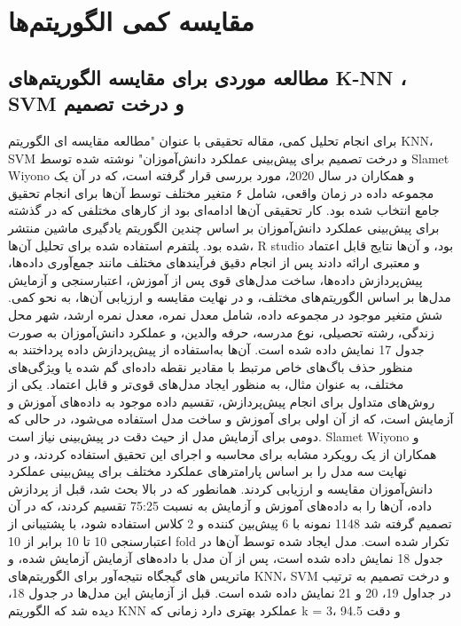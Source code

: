 \documentclass{CSICC2020}
\begin{document}
\section{مقایسه کمی الگوریتم‌ها}


\subsection{مطالعه موردی برای مقایسه الگوریتم‌های K-NN ، SVM و درخت تصمیم }
برای انجام تحلیل کمی، مقاله تحقیقی با عنوان "مطالعه مقایسه ای الگوریتم KNN، SVM و درخت تصمیم برای پیش‌بینی عملکرد دانش‌آموزان" نوشته شده توسط Slamet Wiyono و همکاران در سال 2020، مورد بررسی قرار گرفته است، که در آن یک مجموعه داده در زمان واقعی، شامل ۶ متغیر مختلف توسط آن‌ها برای انجام تحقیق جامع انتخاب شده بود. کار تحقیقی آن‌ها ادامه‌ای بود از کارهای مختلفی که در گذشته برای پیش‌بینی عملکرد دانش‌آموزان بر اساس چندین الگوریتم یادگیری ماشین منتشر شده بود. پلتفرم استفاده شده برای تحلیل آن‌ها، R studio بود، و آن‌ها نتایج قابل اعتماد و معتبری ارائه دادند پس از انجام دقیق فرآیندهای مختلف مانند جمع‌آوری داده‌ها، پیش‌پردازش داده‌ها، ساخت مدل‌های قوی پس از آموزش، اعتبارسنجی و آزمایش مدل‌ها بر اساس الگوریتم‌های مختلف، و در نهایت مقایسه و ارزیابی آن‌ها، به نحو کمی. شش متغیر موجود در مجموعه داده، شامل معدل نمره، معدل نمره ارشد، شهر محل زندگی، رشته تحصیلی، نوع مدرسه، حرفه والدین، و عملکرد دانش‌آموزان به صورت جدول 17 نمایش داده شده است. آن‌ها به‌استفاده از پیش‌پردازش داده پرداختند به منظور حذف باگ‌های خاص مرتبط با مقادیر نقطه داده‌ای گم شده یا ویژگی‌های مختلف، به عنوان مثال، به منظور ایجاد مدل‌های قوی‌تر و قابل اعتماد. یکی از روش‌های متداول برای انجام پیش‌پردازش، تقسیم داده موجود به داده‌های آموزش و آزمایش است، که از آن اولی برای آموزش و ساخت مدل استفاده می‌شود، در حالی که دومی برای آزمایش مدل از حیث دقت در پیش‌بینی نیاز است. Slamet Wiyono و همکاران از یک رویکرد مشابه برای محاسبه و اجرای این تحقیق استفاده کردند، و در نهایت سه مدل را بر اساس پارامترهای عملکرد مختلف برای پیش‌بینی عملکرد دانش‌آموزان مقایسه و ارزیابی کردند. همانطور که در بالا بحث شد، قبل از پردازش داده، آن‌ها را به داده‌های آموزش و آزمایش به نسبت 75:25 تقسیم کردند، که در آن تصمیم گرفته شد 1148 نمونه با 6 پیش‌بین کننده و 2 کلاس استفاده شود، با پشتیبانی از اعتبارسنجی 10 تا 10 برابر از 10 fold تکرار شده است. مدل ایجاد شده توسط آن‌ها در جدول 18 نمایش داده شده است، پس از آن مدل با داده‌های آزمایش آزمایش شده، و ماتریس های گیجگاه نتیجه‌آور برای الگوریتم‌های KNN، SVM و درخت تصمیم به ترتیب در جداول 19، 20 و 21 نمایش داده شده است. قبل از آزمایش این مدل‌ها در جدول 18، دیده شد که الگوریتم KNN عملکرد بهتری دارد زمانی که k = 3، و دقت 94.5%
\end{document}
